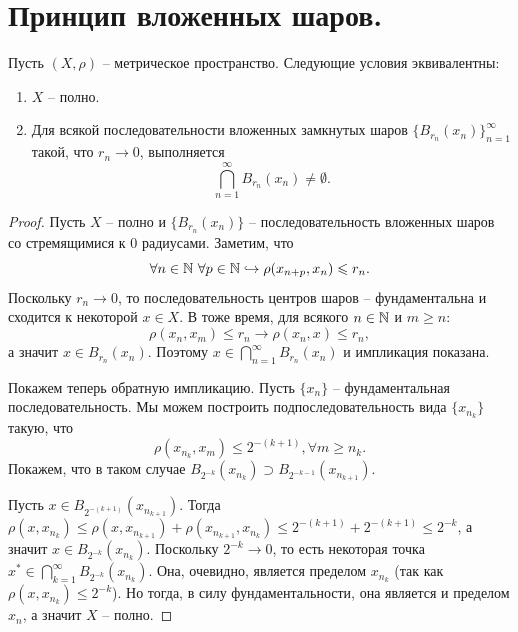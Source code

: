 \section{Принцип вложенных шаров.}
\begin{theorem}
    Пусть $(X, \rho)$ -- метрическое пространство.
    Следующие условия эквивалентны:
    \begin{enumerate}
        \item $X$ -- полно.
        \item Для всякой последовательности вложенных замкнутых шаров $\{B_{r_n}(x_n)\}_{n = 1}^{\infty}$ такой, что $r_n \rightarrow 0$, выполняется
        \[
            \bigcap_{n = 1}^{\infty} B_{r_n}(x_n) \neq \emptyset.
        \]
    \end{enumerate}
\end{theorem}
\begin{proof}
    Пусть $X$ -- полно и $\{B_{r_n}(x_n)\}$ -- последовательность вложенных шаров со стремящимися к 0 радиусами.
    Заметим, что
    \[
        \forall n \in \mathbb{N} \ \forall p \in \mathbb{N} \hookrightarrow \rho(x_{n + p}, x_n) \leqslant r_n.
    \]
    Поскольку $r_n \rightarrow 0$, то последовательность центров шаров -- фундаментальна и сходится к некоторой $x \in X$.
    В тоже время, для всякого $n \in \mathbb{N}$ и $m \geq n\colon$
    \[
        \rho(x_n, x_m) \leq r_n \rightarrow \rho(x_n, x) \leq r_n,
    \]
    а значит $x \in B_{r_n}(x_n)$.
    Поэтому $x \in \bigcap_{n = 1}^{\infty} B_{r_n}(x_n)$ и импликация показана.

    Покажем теперь обратную импликацию.
    Пусть $\{x_n\}$ -- фундаментальная последовательность.
    Мы можем построить подпоследовательность вида $\{x_{n_k}\}$ такую, что
    \[
        \rho(x_{n_k}, x_m) \leq 2^{-(k + 1)}, \forall m \geq n_{k}.
    \]
    Покажем, что в таком случае $B_{2^{-k}}(x_{n_k}) \supset B_{2^{-k - 1}}(x_{n_{k + 1}})$.

    Пусть $x \in B_{2^{-(k + 1)}}(x_{n_{k + 1}})$.
    Тогда $\rho(x, x_{n_k}) \leq \rho(x, x_{n_{k + 1}}) + \rho(x_{n_{k + 1}}, x_{n_k}) \leq 2^{-(k + 1)} + 2^{-(k + 1)} \leq 2^{-k}$, а значит $x \in B_{2^{-k}}(x_{n_k})$.
    Поскольку $2^{-k} \rightarrow 0$, то есть некоторая точка $x^* \in \bigcap_{k = 1}^{\infty} B_{2^{-k}}(x_{n_k})$.
    Она, очевидно, является пределом $x_{n_k}$ (так как $\rho(x, x_{n_k}) \leq 2^{-k}$).
    Но тогда, в силу фундаментальности, она является и пределом $x_n$, а значит $X$ -- полно.
\end{proof}
